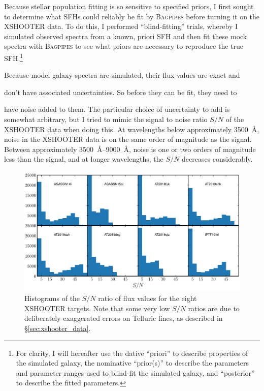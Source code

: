 \documentclass[a4paper,12pt]{article}
\begin{document}
Because stellar population fitting is so sensitive to specified priors, I first
sought to determine what SFHs could reliably be fit by \textsc{Bagpipes} before
turning it on the XSHOOTER data. To do this, I performed ``blind-fitting''
trials, whereby I simulated observed spectra from a known, priori SFH and then
fit these mock spectra with \textsc{Bagpipes} to see what priors are necessary
to reproduce the true SFH.\footnote{For clarity, I will hereafter use the
dative ``priori'' to describe properties of the simulated galaxy, the
nominative ``prior(s)'' to describe the parameters and parameter ranges used to
blind-fit the simulated galaxy, and ``posterior'' to describe the fitted
parameters.}

Because model galaxy spectra are simulated, their flux values are exact and

don't have associated uncertainties. So before they can be fit, they need to

have noise added to them. The particular choice of uncertainty to add is
somewhat arbitrary, but I tried to mimic the signal to noise ratio $S/N$ of the
XSHOOTER data when doing this. At wavelengths below approximately
\SI{3500}{\angstrom}, noise in the XSHOOTER data is on the same order of
magnitude as the signal. Between approximately \SIrange{3500}{9000}{\angstrom},
noise is one or two orders of magnitude less than the signal, and at longer
wavelengths, the $S/N$ decreases considerably.

\begin{figure}
  \includegraphics[width=\textwidth]{tde_sn_hist}
  \caption{Histograms of the $S/N$ ratio of flux values for the eight XSHOOTER
  targets. Note that some very low $S/N$ ratios are due to deliberately
  exaggerated errors on Telluric lines, as described in \S\ref{sec:xshooter_data}.}
  \label{fig:sig_to_noise_histograms}
\end{figure}
\end{document}
